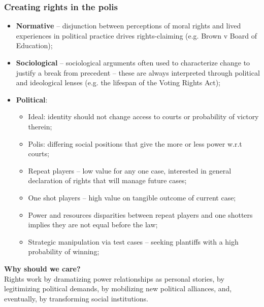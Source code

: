 \documentclass[aspectratio=169]{beamer}
\theoremstyle{principle}
\begin{document}
\begin{frame}
\frametitle{Creating rights in the polis}

\begin{itemize}
\item \textbf{Normative} -- disjunction between perceptions of moral rights and lived experiences in political practice drives rights-claiming (e.g. Brown v Board of Education);
\bigskip
\bigskip
\item \textbf{Sociological} -- sociological arguments often used to characterize change to justify a break from precedent -- these are always interpreted through political and ideological lenses (e.g. the lifespan of the Voting Rights Act);
\bigskip
\bigskip
\item \textbf{Political}:
\begin{itemize}
\item Ideal: identity should not change access to courts or probability of victory therein;
\item Polis: differing social positions that give the more or less power w.r.t courts;
\item Repeat players -- low value for any one case, interested in general declaration of rights that will manage future cases;
\item One shot players -- high value on tangible outcome of current case;
\item Power and resources disparities between repeat players and one shotters implies they are not equal before the law;
\item Strategic manipulation via test cases -- seeking plantiffs with a high probability of winning;
\end{itemize}
\end{itemize}

\end{frame}

\begin{frame}

\begin{center}
\Huge\textbf{Why should we care?}\\
\bigskip
\bigskip
\large Rights work by dramatizing power relationships as personal stories, by legitimizing political demands, by mobilizing new political alliances, and, eventually, by transforming social institutions.
\\
\end{center}

\end{frame}
\end{document}
